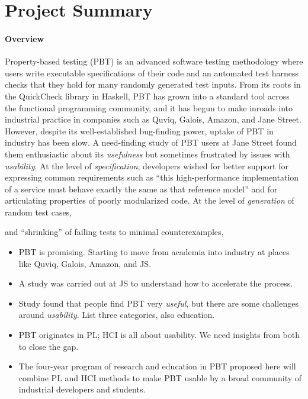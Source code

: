 \section*{Project Summary}


\paragraph*{Overview}
Property-based testing (PBT) is an advanced software testing
methodology where users write executable specifications of their code
and an automated test harness checks that they hold for many randomly
generated test inputs.  From its roots in the QuickCheck library in
Haskell, PBT has grown into a standard tool across the functional
programming community, and it has begun to make inroads into
industrial practice in companies such as Quviq, Galois, Amazon, and
Jane Street.
%
However, despite its well-established bug-finding power, uptake of PBT
in industry has been slow.  A need-finding study of PBT users at Jane
Street found them enthusiastic about its {\em usefulness} but
sometimes frustrated by issues with {\em usability}.
%
At the level of {\em specification}, developers wished for better
support for expressing common requirements such as ``this
high-performance implementation of a service must behave exactly the
same as that reference model'' and for articulating properties of
poorly modularized code.
% 
At the level of {\em generation} of random test cases,

 and ``shrinking'' of failing
tests to minimal counterexamples,  

\begin{itemize}
\item PBT is promising.  Starting to move from academia into industry
at places like Quviq, Galois, Amazon, and JS.
\item A study was carried out at JS to understand how to accelerate the
process.
\item Study found that people find PBT very {\em useful}, but there are
some challenges around {\em usability}.  List three categories, also
education.
\item PBT originates in PL; HCI is all about usability.  We need
insights from both to close the gap.
\item The four-year program of research and education in
PBT proposed here will combine PL and HCI methods to make PBT usable by a broad
community of industrial developers and students.
\end{itemize}


